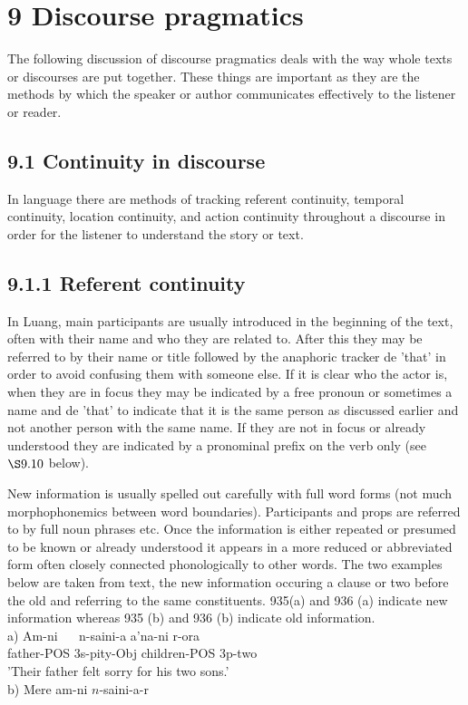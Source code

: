 \documentclass[10pt]{article}
\begin{document}
\section*{9 Discourse pragmatics}
The following discussion of discourse pragmatics deals with the way whole texts or discourses are put together. These things are important as they are the methods by which the speaker or author communicates effectively to the listener or reader.

\subsection*{9.1 Continuity in discourse}
In language there are methods of tracking referent continuity, temporal continuity, location continuity, and action continuity throughout a discourse in order for the listener to understand the story or text.

\subsection*{9.1.1 Referent continuity}
In Luang, main participants are usually introduced in the beginning of the text, often with their name and who they are related to. After this they may be referred to by their name or title followed by the anaphoric tracker de 'that' in order to avoid confusing them with someone else. If it is clear who the actor is, when they are in focus they may be indicated by a free pronoun or sometimes a name and de 'that' to indicate that it is the same person as discussed earlier and not another person with the same name. If they are not in focus or already understood they are indicated by a pronominal prefix on the verb only (see \(\S 9.10\) below).

New information is usually spelled out carefully with full word forms (not much morphophonemics between word boundaries). Participants and props are referred to by full noun phrases etc. Once the information is either repeated or presumed to be known or already understood it appears in a more reduced or abbreviated form often closely connected phonologically to other words. The two examples below are taken from text, the new information occuring a clause or two before the old and referring to the same constituents. 935(a) and 936 (a) indicate new information whereas 935 (b) and 936 (b) indicate old information.\\
a) Am-ni \(\quad\) n-saini-a a'na-ni r-ora\\
father-POS 3s-pity-Obj children-POS 3p-two\\
'Their father felt sorry for his two sons.'\\
b) Mere am-ni \(n\)-saini-a-r
\end{document}

